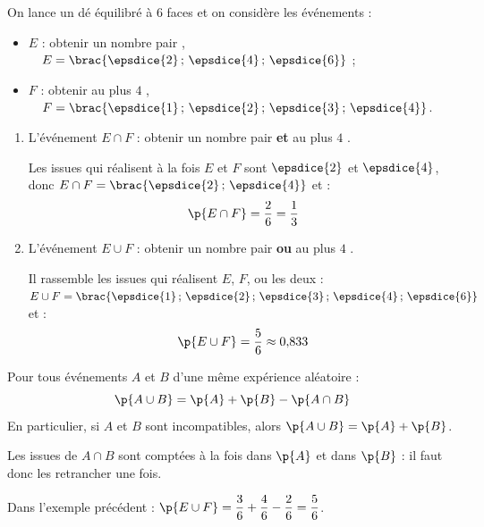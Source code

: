 \begin{ex}
	On lance un dé équilibré à 6 faces et on considère les événements :

	\begin{itemize}
		\item $E$ : \og obtenir un nombre pair \fg{}, $\quad E = \brac{\epsdice{2}\,;\,\epsdice{4}\,;\,\epsdice{6}}$ ;
		\item $F$ : \og obtenir au plus $4$ \fg{}, $\quad F = \brac{\epsdice{1}\,;\,\epsdice{2}\,;\,\epsdice{3}\,;\,\epsdice{4}}$.
	\end{itemize}

	\begin{enumerate}
		\item L'événement $E \cap F$ : \og obtenir un nombre pair \textbf{et} au plus $4$ \fg{}.

		      Les issues qui réalisent à la fois $E$ et $F$ sont $\epsdice{2}$ et $\epsdice{4}$, donc $E \cap F = \brac{\epsdice{2}\,;\,\epsdice{4}}$ et :
		      \[
			      \p{E \cap F} = \dfrac{2}{6} = \dfrac{1}{3}
		      \]
		\item L'événement $E \cup F$ : \og obtenir un nombre pair \textbf{ou} au plus $4$ \fg{}.

		      Il rassemble les issues qui réalisent $E$, $F$, ou les deux : $E \cup F = \brac{\epsdice{1}\,;\,\epsdice{2}\,;\,\epsdice{3}\,;\,\epsdice{4}\,;\,\epsdice{6}}$ et :
		      \[
			      \p{E \cup F} = \dfrac{5}{6} \approx 0{,}833
		      \]
	\end{enumerate}
\end{ex}

\begin{prop}
	Pour tous événements $A$ et $B$ d'une même expérience aléatoire :
	\[
		\p{A \cup B} = \p{A} + \p{B} - \p{A \cap B}
	\]
	En particulier, si $A$ et $B$ sont incompatibles, alors $\p{A \cup B} = \p{A} + \p{B}$.
\end{prop}

\begin{rem}
	Les issues de $A \cap B$ sont comptées à la fois dans $\p{A}$ et dans $\p{B}$ : il faut donc les retrancher une fois.

	Dans l'exemple précédent : $\p{E \cup F} = \dfrac{3}{6} + \dfrac{4}{6} - \dfrac{2}{6} = \dfrac{5}{6}$.
\end{rem}

